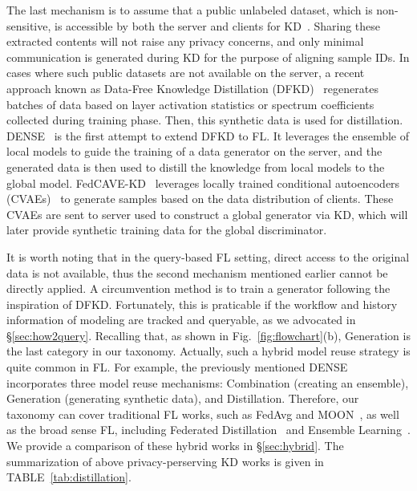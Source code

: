 The last mechanism is to assume that a public unlabeled dataset, which is non-sensitive, is accessible by both the server and clients for KD~\cite{li2021practical, li2019fedmd, gong2021ensemble, sun2020federated, huang2022learn, sattler2021fedaux, fang2022robust, gong2022preserving, chang2021cronus, zhang2021parameterized, itahara2021distillation}.
Sharing these extracted contents will not raise any privacy concerns, and only minimal communication is generated during KD for the purpose of aligning sample IDs.
In cases where such public datasets are not available on the server, a recent approach known as Data-Free Knowledge Distillation (DFKD)~\cite{lopes2017data} regenerates batches of data based on layer activation statistics or spectrum coefficients collected during training phase. 
Then, this synthetic data is used for distillation.
DENSE~\cite{zhang2022dense} is the first attempt to extend DFKD to FL. It leverages the ensemble of local models to guide the training of a data generator on the server, and the generated data is then used to distill the knowledge from local models to the global model.
FedCAVE-KD~\cite{heinbaugh2023data} leverages locally trained conditional autoencoders (CVAEs)~\cite{kingma2014auto} to generate samples based on the data distribution of clients. 
These CVAEs are sent to server used to construct a global generator via KD, which will later provide synthetic training data for the global discriminator.

It is worth noting that in the query-based FL setting, direct access to the original data is not available, thus the second mechanism mentioned earlier cannot be directly applied.
A circumvention method is to train a generator following the inspiration of DFKD. 
Fortunately, this is praticable if the workflow and history information of modeling are tracked and queryable, as we advocated in \S\ref{sec:how2query}.
Recalling that, as shown in Fig.~\ref{fig:flowchart}(b), Generation is the last category in our taxonomy.
Actually, such a hybrid model reuse strategy is quite common in FL. 
For example, the previously mentioned DENSE~\cite{zhang2022dense} incorporates three model reuse mechanisms: Combination (creating an ensemble), Generation (generating synthetic data), and Distillation.
Therefore, our taxonomy can cover traditional FL works, such as FedAvg and MOON~\cite{li2021model}, as well as the broad sense FL, including Federated Distillation~\cite{jeong2018communication, jin2023feddyn} and Ensemble Learning~\cite{shi2023fed, wang2023data}.
We provide a comparison of these hybrid works in \S\ref{sec:hybrid}. 
The summarization of above privacy-perserving KD works is given in TABLE~\ref{tab:distillation}.

